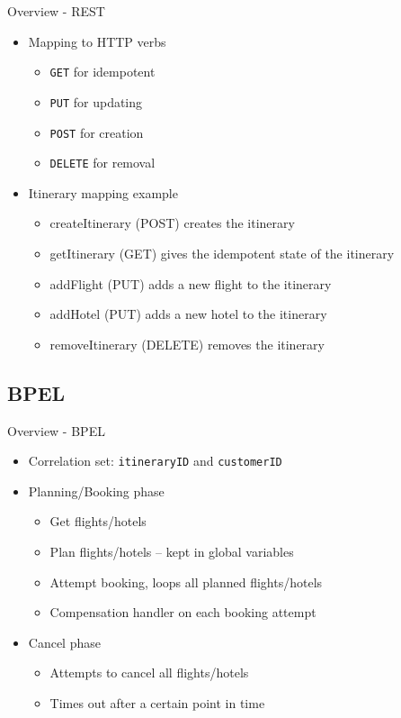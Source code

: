 \begin{frame}{Overview - REST}
\begin{itemize}[<+->]
	
	\item Mapping to HTTP verbs
	\begin{itemize}	[<2->]
		\item \texttt{GET} for idempotent
		\item \texttt{PUT} for updating
		\item \texttt{POST} for creation
		\item \texttt{DELETE} for removal
	\end{itemize}
		
	\medskip\item <3-> Itinerary mapping example
	\begin{itemize}[<4->]
		\item createItinerary (POST) creates the itinerary
		\item getItinerary (GET) gives the idempotent state of the itinerary
		\item addFlight (PUT) adds a new flight to the itinerary
		\item addHotel (PUT) adds a new hotel to the itinerary
		\item removeItinerary (DELETE) removes the itinerary
	\end{itemize}

\end{itemize}
\end{frame}

\subsection{BPEL}
\begin{frame}{Overview - BPEL}
\begin{itemize}[<+->]
	\item Correlation set: \texttt{itineraryID} and \texttt{customerID}

	\medskip\item Planning/Booking phase
	\begin{itemize}
		\item Get flights/hotels
		\item<3-> Plan flights/hotels -- kept in global variables
		\item Attempt booking, loops all planned flights/hotels
		\item Compensation handler on each booking attempt
	\end{itemize}

	\medskip\item Cancel phase
	\begin{itemize}
		\item Attempts to cancel all flights/hotels
		\item<7-> Times out after a certain point in time
	\end{itemize}
\end{itemize}
\end{frame}



